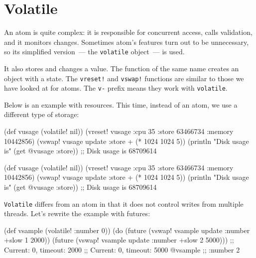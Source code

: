 \section{Volatile}

An atom is quite complex: it is responsible for concurrent access, calls validation, and it monitors changes. Sometimes atom's features turn out to be unnecessary, so its simplified version~--- the \verb|volatile| object~--- is used.


It also stores and changes a value.
The function of the same name creates an object with a state.
The \verb|vreset!| and \verb|vswap!| functions are similar to those we have looked at for atoms.
The \verb|v-| prefix means they work with \verb|volatile|.

Below is an example with resources. This time, instead of an atom, we use a different type of storage:

\ifx\DEVICETYPE\MOBILE

\begin{clojure}
(def vusage (volatile! nil))
(vreset! vusage
         {:cpu 35
          :store 63466734
          :memory 10442856})
(vswap! vusage
  update :store + (* 1024 1024 5))
(println
  "Disk usage is" (get @vusage :store))
;; Disk usage is 68709614
\end{clojure}

\else

\begin{clojure}
(def vusage (volatile! nil))
(vreset! vusage
         {:cpu 35
          :store 63466734
          :memory 10442856})
(vswap! vusage update :store + (* 1024 1024 5))
(println "Disk usage is" (get @vusage :store))
;; Disk usage is 68709614
\end{clojure}

\fi

\verb|Volatile| differs from an atom in that it does not control writes from multiple threads.
Let's rewrite the example with futures:

\ifx\DEVICETYPE\MOBILE

\begin{clojure}
(def vsample (volatile! {:number 0}))
(do (future (vswap! vsample update
              :number +slow 1 2000))
    (future (vswap! vsample update
              :number +slow 2 5000)))
;; Current: 0, timeout: 2000
;; Current: 0, timeout: 5000
@vsample ;; {:number 2}
\end{clojure}

